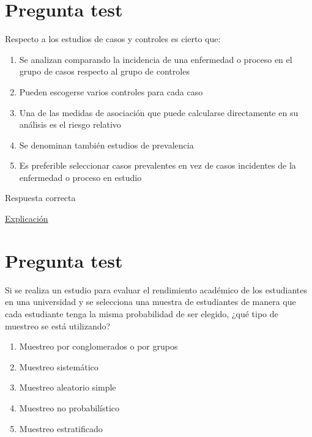 \documentclass[
]{book}
\providecommand{\tightlist}{%
  \setlength{\itemsep}{0pt}\setlength{\parskip}{0pt}}
\begin{document}
\hypertarget{pregunta-test-26}{%
\section{Pregunta test}\label{pregunta-test-26}}

Respecto a los estudios de casos y controles es cierto que:

\begin{enumerate}
\def\labelenumi{\alph{enumi})}
\tightlist
\item
  Se analizan comparando la incidencia de una enfermedad o proceso en el grupo de casos respecto al grupo de controles
\item
  Pueden escogerse varios controles para cada caso
\item
  Una de las medidas de asociación que puede calcularse directamente en su análisis es el riesgo relativo
\item
  Se denominan también estudios de prevalencia
\item
  Es preferible seleccionar casos prevalentes en vez de casos incidentes de la enfermedad o proceso en estudio
\end{enumerate}

Respuesta correcta

\href{https://dsp.facmed.unam.mx/wp-content/uploads/2022/02/Anexo-1C-U-9-Estudios-de-casos-y-controles.-Argimon-J.pdf}{Explicación}

\hypertarget{pregunta-test-27}{%
\section{Pregunta test}\label{pregunta-test-27}}

Si se realiza un estudio para evaluar el rendimiento académico de los estudiantes en una universidad y se selecciona una muestra de estudiantes de manera que cada estudiante tenga la misma probabilidad de ser elegido, ¿qué tipo de muestreo se está utilizando?

\begin{enumerate}
\def\labelenumi{\alph{enumi})}
\tightlist
\item
  Muestreo por conglomerados o por grupos
\item
  Muestreo sistemático
\item
  Muestreo aleatorio simple
\item
  Muestreo no probabilístico
\item
  Muestreo estratificado
\end{enumerate}
\end{document}
